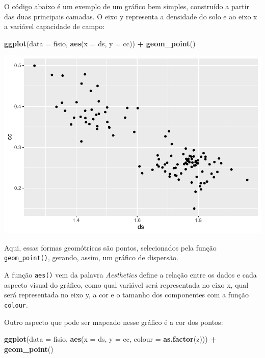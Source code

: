 \documentclass[
]{book}
\newenvironment{Shaded}{\begin{snugshade}}{\end{snugshade}}
\newcommand{\DataTypeTok}[1]{\textcolor[rgb]{0.13,0.29,0.53}{#1}}
\newcommand{\KeywordTok}[1]{\textcolor[rgb]{0.13,0.29,0.53}{\textbf{#1}}}
\newcommand{\NormalTok}[1]{#1}
\newcommand{\OperatorTok}[1]{\textcolor[rgb]{0.81,0.36,0.00}{\textbf{#1}}}
\newcommand{\StringTok}[1]{\textcolor[rgb]{0.31,0.60,0.02}{#1}}
\begin{document}
O código abaixo é um exemplo de um gráfico bem simples, construído a partir das duas principais camadas. O eixo y representa a densidade do solo e ao eixo x a variável capacidade de campo:

\begin{Shaded}
\begin{Highlighting}[]
\KeywordTok{ggplot}\NormalTok{(}\DataTypeTok{data =}\NormalTok{ fisio, }\KeywordTok{aes}\NormalTok{(}\DataTypeTok{x =}\NormalTok{ ds, }\DataTypeTok{y =}\NormalTok{ cc)) }\OperatorTok{+}
\StringTok{  }\KeywordTok{geom_point}\NormalTok{()}
\end{Highlighting}
\end{Shaded}

\includegraphics{TudodoR_files/figure-latex/unnamed-chunk-186-1.pdf}

Aqui, essas formas geomótricas são pontos, selecionados pela função \texttt{geom\_point()}, gerando, assim, um gráfico de dispersão.

A função \texttt{aes()} vem da palavra \emph{Aesthetics} define a relação entre os dados e cada aspecto visual do gráfico, como qual variável será representada no eixo x, qual será representada no eixo y, a cor e o tamanho dos componentes com a função \texttt{colour}.

Outro aspecto que pode ser mapeado nesse gráfico é a cor dos pontos:

\begin{Shaded}
\begin{Highlighting}[]
\KeywordTok{ggplot}\NormalTok{(}\DataTypeTok{data =}\NormalTok{ fisio, }\KeywordTok{aes}\NormalTok{(}\DataTypeTok{x =}\NormalTok{ ds, }\DataTypeTok{y =}\NormalTok{ cc, }\DataTypeTok{colour =} \KeywordTok{as.factor}\NormalTok{(z))) }\OperatorTok{+}
\StringTok{  }\KeywordTok{geom_point}\NormalTok{()}
\end{Highlighting}
\end{Shaded}
\end{document}
